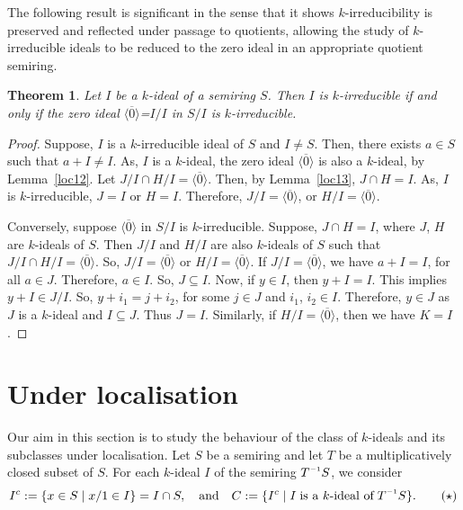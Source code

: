 \documentclass[11pt,leqno]{amsart}
\newcommand{\inv}{^{\raisebox{.2ex}{$\scriptscriptstyle-1$}}}
\newtheorem{theorem}{Theorem}[section]
\theoremstyle{definition}
\numberwithin{equation}{section}
\begin{document}
The following result is significant in the sense that it shows $k$-irreducibility is preserved and reflected under passage to quotients, allowing the study of $k$-irreducible ideals to be reduced to the zero ideal in an appropriate quotient semiring.

\begin{theorem}
    Let $I$ be a $k$-ideal of a semiring $S$. Then $I$ is $k$-irreducible if and only if the zero ideal $\langle \overline{0}\rangle$=$I/I$ in $S/I$ is $k$-irreducible.
\end{theorem}

\begin{proof}
    Suppose, $I$ is a $k$-irreducible ideal of $S$ and $I\neq S$. Then, there exists $a \in S$ such that $a+I\neq I$. As, $I$ is a $k$-ideal, the zero ideal $\langle \overline{0}\rangle$ is also a $k$-ideal, by Lemma~\ref{loc12}. Let $J/I \cap H/I = \langle \overline{0}\rangle$. Then, by Lemma~\ref{loc13}, $J\cap H =I$. As, $I$ is $k$-irreducible, $J=I$ or $H=I$. Therefore, $J/I=\langle \overline{0}\rangle$, or $H/I = \langle \overline{0}\rangle$.
    
Conversely, suppose $\langle \overline{0}\rangle$ in $S/I$ is $k$-irreducible. Suppose, $J \cap H =I$, where $J$, $H$ are $k$-ideals of $S$. Then $J/I$ and $H/I$ are also $k$-ideals of $S$ such that $J/I \cap H/I = \langle \overline{0}\rangle$. So, $J/I = \langle \overline{0}\rangle$ or $H/I=\langle \overline{0}\rangle$. If $J/I=\langle \overline{0}\rangle$, we have  $a+I=I$, for all $a \in J$. Therefore, $a \in I$. So, $J \subseteq I$. Now, if $y \in I$, then $y+I=I$. This implies $y+I \in J/I$. So, $y+i_1 = j+i_2$, for some $j \in J$ and $i_1$, $i_2 \in I$. Therefore, $y \in J$ as $J$ is a $k$-ideal and $I \subseteq J$. Thus $J=I$. Similarly, if $H/I = \langle \overline{0}\rangle$, then we have $K=I$. 
\end{proof}

\section{Under localisation}\label{Section 5: k-ideals under localisation}

Our aim in this section is to study the behaviour of the class of $k$-ideals and its subclasses under localisation. 
Let $S$ be a semiring and let $T$ be a multiplicatively closed subset of $S$. For each $k$-ideal $I$
of the semiring $T\inv{S}$, we consider
\begin{equation}
    I^c:= \{x \in S \mid x/1 \in I \} = I \cap S,\quad
\text{and}\quad  C:= \{I^c \mid I \;\text{is a $k$-ideal of}\; T\inv S\}. \tag{$\star$}\label{Equation of C}
\end{equation}
\end{document}
